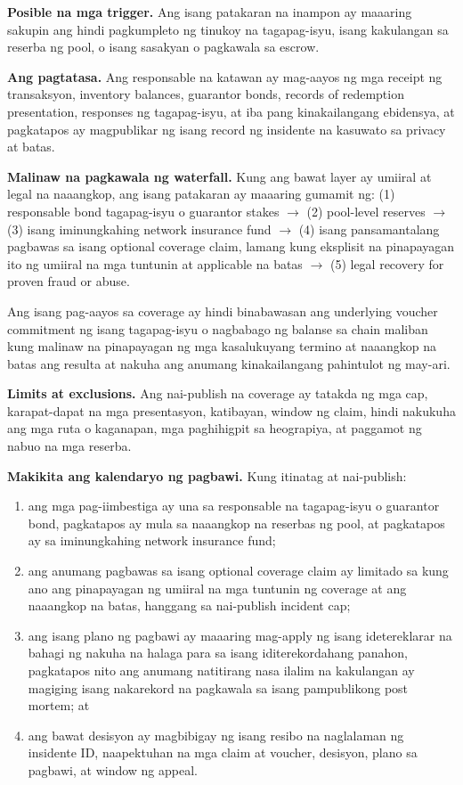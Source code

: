 \documentclass[11pt]{article}
\begin{document}
\textbf{Posible na mga trigger.} Ang isang patakaran na inampon ay maaaring sakupin ang hindi pagkumpleto ng tinukoy na tagapag-isyu, isang kakulangan sa reserba ng pool, o isang sasakyan o pagkawala sa escrow.

\textbf{Ang pagtatasa.} Ang responsable na katawan ay mag-aayos ng mga receipt ng transaksyon, inventory balances, guarantor bonds, records of redemption presentation, responses ng tagapag-isyu, at iba pang kinakailangang ebidensya, at pagkatapos ay magpublikar ng isang record ng insidente na kasuwato sa privacy at batas.

\textbf{Malinaw na pagkawala ng waterfall.} Kung ang bawat layer ay umiiral at legal na naaangkop, ang isang patakaran ay maaaring gumamit ng: (1) responsable bond tagapag-isyu o guarantor stakes $\to$ (2) pool-level reserves $\to$ (3) isang iminungkahing network insurance fund $\to$ (4) isang pansamantalang pagbawas sa isang optional coverage claim, lamang kung eksplisit na pinapayagan ito ng umiiral na mga tuntunin at applicable na batas $\to$ (5) legal recovery for proven fraud or abuse.

Ang isang pag-aayos sa coverage ay hindi binabawasan ang underlying voucher commitment ng isang tagapag-isyu o nagbabago ng balanse sa chain maliban kung malinaw na pinapayagan ng mga kasalukuyang termino at naaangkop na batas ang resulta at nakuha ang anumang kinakailangang pahintulot ng may-ari.

\textbf{Limits at exclusions.} Ang nai-publish na coverage ay tatakda ng mga cap, karapat-dapat na mga presentasyon, katibayan, window ng claim, hindi nakukuha ang mga ruta o kaganapan, mga paghihigpit sa heograpiya, at paggamot ng nabuo na mga reserba.

\textbf{Makikita ang kalendaryo ng pagbawi.} Kung itinatag at nai-publish:

\begin{enumerate}[leftmargin=*]
\item ang mga pag-iimbestiga ay una sa responsable na tagapag-isyu o guarantor bond, pagkatapos ay mula sa naaangkop na reserbas ng pool, at pagkatapos ay sa iminungkahing network insurance fund;
\item ang anumang pagbawas sa isang optional coverage claim ay limitado sa kung ano ang pinapayagan ng umiiral na mga tuntunin ng coverage at ang naaangkop na batas, hanggang sa nai-publish incident cap;
\item ang isang plano ng pagbawi ay maaaring mag-apply ng isang idetereklarar na bahagi ng nakuha na halaga para sa isang iditerekordahang panahon, pagkatapos nito ang anumang natitirang nasa ilalim na kakulangan ay magiging isang nakarekord na pagkawala sa isang pampublikong post mortem; at
\item ang bawat desisyon ay magbibigay ng isang resibo na naglalaman ng insidente ID, naapektuhan na mga claim at voucher, desisyon, plano sa pagbawi, at window ng appeal.
\end{enumerate}
\end{document}
